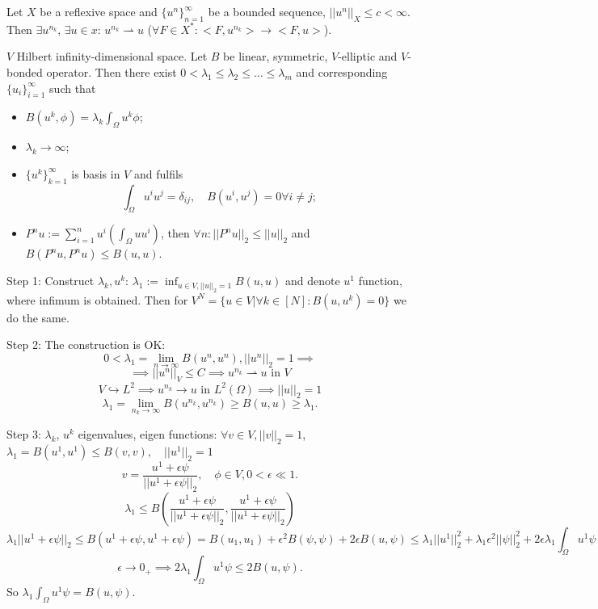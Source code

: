 \documentclass[12pt]{article}					%
\begin{document}
\begin{lemma}
	Let $X$ be a reflexive space and $\{u^n\}_{n=1}^∞$ be a bounded sequence, $||u^n||_X ≤ c < ∞$. Then $\exists u^{n_k}$, $\exists u \in x$: $u^{n_k} \rightharpoonup u$ ($\forall F \in X^*: <F, u^{n_k}> \rightarrow <F, u>$).
\end{lemma}


\begin{veta}
	$V$ Hilbert infinity-dimensional space. Let $B$ be linear, symmetric, $V$-elliptic and $V$-bonded operator. Then there exist $0 < \lambda_1 ≤ \lambda_2 ≤ … ≤ \lambda_m$ and corresponding $\{u_i\}_{i=1}^∞$ such that
	\begin{itemize}
		\item $B(u^k, \phi) = \lambda_k \int_\Omega u^k \phi$;
		\item $\lambda_k \rightarrow ∞$;
		\item $\{u^k\}_{k=1}^∞$ is basis in $V$ and fulfils
			$$ \int_\Omega u^i u^j = \delta_{ij}, \quad B(u^i, u^j) = 0 \forall i ≠ j; $$
		\item $P^n u := \sum_{i=1}^n u^i (\int_\Omega u u^i)$, then $\forall n: ||P^n u||_2 ≤ ||u||_2$ and $B(P^n u, P^n u) ≤ B(u, u)$.
	\end{itemize}

	\begin{dukazin}
		Step 1: Construct $\lambda_k, u^k$: $\lambda_1 := \inf_{u \in V, ||u||_2 = 1} B(u, u)$ and denote $u^1$ function, where infimum is obtained. Then for $V^N = \{u \in V | \forall k \in [N]: B(u, u^k) = 0\}$ we do the same.

		Step 2: The construction is OK:
		$$ 0 < \lambda_1 = \lim_{n \rightarrow ∞} B(u^n, u^n), ||u^n||_2 = 1 \implies $$
		$$ \implies ||u^n||_V ≤ C \implies u^{n_k} \rightharpoonup u \text{ in } V $$
		$$ V \hookrightarrow L^2 \implies u^{n_k} \rightarrow u \text{ in } L^2(\Omega) \implies ||u||_2 = 1 $$
		$$ \lambda_1 = \lim_{n_k \rightarrow ∞} B(u^{n_k}, u^{n_k}) ≥ B(u, u) ≥ \lambda_1. $$

		Step 3: $\lambda_k$, $u^k$ eigenvalues, eigen functions: $\forall v \in V, ||v||_2 = 1$, $\lambda_1 = B(u^1, u^1) ≤ B(v, v), \quad ||u^1||_2 = 1$
		$$ v = \frac{u^1 + \epsilon \psi}{||u^1 + \epsilon \psi||_2}, \quad \phi \in V, 0 < \epsilon \ll 1. $$
		$$ \lambda_1 ≤ B(\frac{u^1 + \epsilon \psi}{||u^1 + \epsilon \psi||_2}, \frac{u^1 + \epsilon \psi}{||u^1 + \epsilon \psi||_2}) $$
		$$ \lambda_1 ||u^1 + \epsilon \psi||_2 ≤ B(u^1 + \epsilon \psi, u^1 + \epsilon \psi) = B(u_1, u_1) + \epsilon^2 B(\psi, \psi) + 2 \epsilon B(u, \psi) ≤ \lambda_1 ||u^1||_2^2 + \lambda_1 \epsilon^2 ||\psi||_2^2 + 2 \epsilon \lambda_1 \int_\Omega u^1 \psi $$
		$$ \epsilon \rightarrow 0_+ \implies 2 \lambda_1 \int_\Omega u^1 \psi ≤ 2B(u, \psi). $$
		So $\lambda_1 \int_\Omega u^1 \psi = B(u, \psi)$.


\end{dukazin}
\end{veta}
\end{document}
